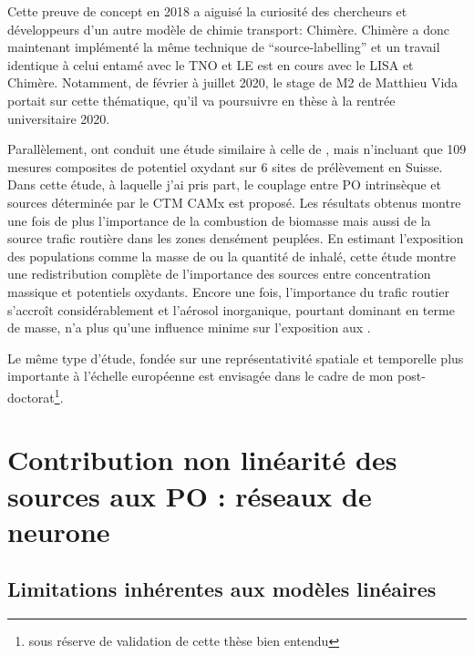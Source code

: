 Cette preuve de concept en 2018 a aiguisé la curiosité des chercheurs et développeurs
d'un autre modèle de chimie transport: Chimère. Chimère a donc maintenant implémenté la
même technique de ``source-labelling'' et un travail identique à celui entamé avec le TNO
et LE est en cours avec le LISA et Chimère. Notamment, de février à juillet 2020, le
stage de M2 de Matthieu Vida portait sur cette thématique, qu'il va poursuivre en thèse à
la rentrée universitaire 2020.

Parallèlement, \cite{daellenbachSourcessubmitted} ont conduit une étude similaire à celle
de \cite{weberSourceinprep.}, mais n'incluant que 109 mesures composites de potentiel
oxydant sur 6 sites de prélèvement en Suisse. Dans cette étude, à laquelle j'ai pris
part, le couplage entre PO intrinsèque et sources déterminée par le CTM CAMx est proposé.
Les résultats obtenus montre une fois de plus
l'importance de la combustion de biomasse mais aussi de la source trafic routière dans
les zones densément peuplées. En estimant l'exposition des populations comme la masse de
\PMdix{} ou la quantité de \POv{} inhalé, cette étude montre une
redistribution complète de l'importance des sources entre concentration massique et
potentiels oxydants. Encore une fois, l'importance du trafic routier s'accroît
considérablement et l'aérosol inorganique, pourtant dominant en terme de masse, n'a plus
qu'une influence minime sur l'exposition aux \POv.

Le même type d'étude, fondée sur une représentativité spatiale et temporelle plus
importante à l'échelle européenne est envisagée dans le cadre de mon
post-doctorat\footnote{sous réserve de validation de cette thèse bien entendu}.


\section{Contribution non linéarité des sources aux PO : réseaux de neurone}

\subsection{Limitations inhérentes aux modèles linéaires}%
\label{sub:limitations_inhérentes_aux_modèles_linéaires}


